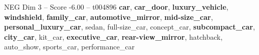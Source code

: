 \begin{textsample}{NEG Dim 3 – Score -6.00 – t004896}  \label{ex:f3_neg_020}
\textbf{car}, \textbf{car\_door}, \textbf{luxury\_vehicle}, \textbf{windshield}, \textbf{family\_car}, \textbf{automotive\_mirror}, \textbf{mid-size\_car}, \textbf{personal\_luxury\_car}, sedan, full-size\_car, concept\_car, \textbf{subcompact\_car}, \textbf{city\_car}, kit\_car, \textbf{executive\_car}, \textbf{rear-view\_mirror}, hatchback, auto\_show, sports\_car, performance\_car

\end{textsample}
